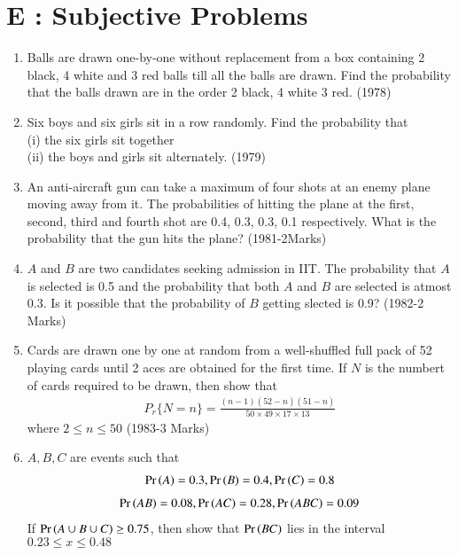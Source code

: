 \documentclass[journal,,12pt,onecolumn]{IEEEtran}
\theoremstyle{remark}
\begin{document}
\section*{E : Subjective Problems}
\begin{enumerate}
    \item Balls are drawn one-by-one without replacement from a box containing 2 black, 4 white and 3 red balls till all the balls are drawn. Find the probability that the balls drawn are in the order 2 black, 4 white 3 red.
    \hfill{(1978)}

    \item Six boys and six girls sit in a row randomly. Find the probability that \\
    (i)   the six girls sit together \\
    (ii)  the boys and girls sit alternately.
    \hfill{(1979)}
    \item An anti-aircraft gun can take a maximum of four shots at an enemy plane moving away from it. The probabilities of hitting the plane at the first, second, third and fourth shot are 0.4, 0.3, 0.3, 0.1 respectively. What is the probability that the gun hits the plane?
    \hfill{(1981-2Marks) }
    \item $A$ and $B$ are two candidates seeking admission in IIT. The probability that $A$ is selected is 0.5 and the probability that both $A$ and $B$ are selected is atmost 0.3. Is it possible that the probability of $B$ getting slected is 0.9?
    \hfill{(1982-2 Marks)}



\item Cards are drawn one by one at random from a well-shuffled full pack of 52 playing cards until 2 aces are obtained for the first time. If $N$ is the numbert of cards required to be drawn, then show that \begin{align*}
        P_r\{N=n\}=\frac{(n-1)(52-n)(51-n)}{50\times49\times17\times13} 
    \end{align*} where $2\le n\le 50$
    \hfill{(1983-3 Marks)}
    \item $A,B,C$ are events such that \begin{align*} \Pr\left(A\right)=0.3, \Pr\left(B\right)=0.4, \Pr\left(C\right)=0.8 \end{align*} \begin{align*}\Pr\left(AB\right)=0.08, \Pr\left(AC\right)=0.28, \Pr\left(ABC\right)=0.09 \end{align*} If $\Pr\left(A \cup B \cup C\right)\ge 0.75$, then show that $\Pr\left(BC\right)$ lies in the interval $0.23 \le x \le 0.48$
        

\end{enumerate}
\end{document}
